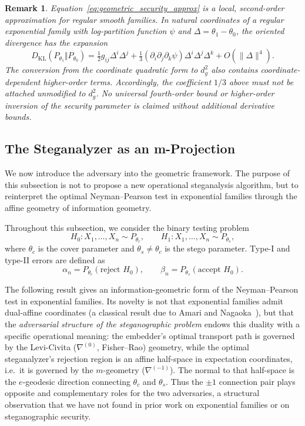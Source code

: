 \documentclass[a4paper,fleqn]{cas-dc}
\newtheorem{remark}{Remark}
\begin{document}
\begin{remark}%
Equation~\eqref{eq:geometric_security_approx} is a local, second-order
approximation for regular smooth families. In natural coordinates of a
regular exponential family with log-partition function $\psi$ and
$\Delta=\theta_1-\theta_0$, the oriented divergence has the expansion
\[
 D_{\mathrm{KL}}(P_{\theta_1}\Vert P_{\theta_0})
 =\tfrac12 g_{ij}\Delta^i\Delta^j
 +\tfrac13 (\partial_i\partial_j\partial_k\psi)
 \Delta^i\Delta^j\Delta^k+O(\|\Delta\|^4).
\]
The conversion from the coordinate quadratic form to $d_g^2$ also
contains coordinate-dependent higher-order terms. Accordingly, the
coefficient $1/3$ above must not be attached unmodified to $d_g^2$.
No universal fourth-order bound or higher-order inversion of the
security parameter is claimed without additional derivative bounds.
\end{remark}

\subsection{The Steganalyzer as an m-Projection}
\label{sec:detection_duality}

We now introduce the adversary into the geometric framework.
The purpose of this subsection is not to propose a new operational
steganalysis algorithm, but to reinterpret the optimal Neyman--Pearson
test in exponential families through the affine geometry of information
geometry.

Throughout this subsection, we consider the binary testing problem
\[
H_0 : X_1,\ldots,X_n \sim P_{\theta_c},
\qquad
H_1 : X_1,\ldots,X_n \sim P_{\theta_s},
\]
where $\theta_c$ is the cover parameter and $\theta_s\neq\theta_c$ is the
stego parameter.  Type-I and type-II errors are defined as
\[
\alpha_n = P_{\theta_c}(\text{reject }H_0),
\qquad
\beta_n = P_{\theta_s}(\text{accept }H_0).
\]

The following result gives an information-geometric form of the
Neyman--Pearson test in exponential families.
Its novelty is not that exponential families admit dual-affine coordinates
(a classical result due to Amari and Nagaoka~\cite{amari2000methods}), but
that the \emph{adversarial structure of the steganographic problem} endows
this duality with a specific operational meaning: the embedder's optimal
transport path is governed by the Levi-Civita ($\nabla^{(0)}$, Fisher--Rao)
geometry, while the optimal steganalyzer's rejection region is an affine
half-space in expectation coordinates, i.e.\ it is governed by the
$m$-geometry ($\nabla^{(-1)}$).
The normal to that half-space is the $e$-geodesic direction connecting
$\theta_c$ and $\theta_s$.
Thus the $\pm 1$ connection pair plays opposite and complementary roles for
the two adversaries, a structural observation that we have not found in prior
work on exponential families or on steganographic security.
\end{document}
